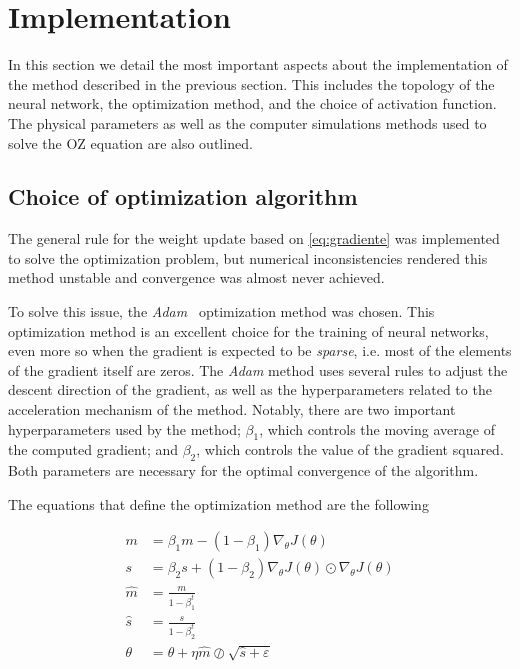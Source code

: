 \section{Implementation}
In this section we detail the most important aspects about the implementation of the
method described in the previous section. This includes the topology of the neural network,
the optimization method, and the choice of activation function. The physical parameters
as well as the computer simulations methods used to solve the OZ equation are also outlined.

\subsection{Choice of optimization algorithm}
The general rule for the weight update based on \autoref{eq:gradiente} was
implemented to solve the optimization problem, but numerical inconsistencies rendered this 
method unstable and convergence was almost never achieved.

To solve this issue, the \emph{Adam}~\cite{kingmaAdamMethodStochastic2017} optimization 
method was chosen. This optimization method is an excellent choice for the training
of neural networks, even more so when the gradient is expected to be \emph{sparse}, i.e.
most of the elements of the gradient itself are zeros.
The \emph{Adam} method uses several rules to adjust the descent direction of the gradient,
as well as the hyperparameters related to the acceleration mechanism of the method.
Notably, there are two important hyperparameters used by the method; $\beta_1$,
which controls the moving average of the computed gradient; and $\beta_2$, which controls
the value of the gradient squared. Both parameters are necessary for the optimal 
convergence of the algorithm.

The equations that define the optimization method are the following

\begin{align}
    m &= \beta_1 m - (1 - \beta_1) \nabla_{\theta} J(\theta) \nonumber \\
    s &= \beta_2 s + (1 - \beta_2) \nabla_{\theta} J(\theta) \odot \nabla_{\theta} J(\theta) \nonumber \\
    \hat{m} &= \frac{m}{1 - \beta_1^t} \nonumber \\
    \hat{s} &= \frac{s}{1 - \beta_2^t} \nonumber \\
    \theta &= \theta + \eta \hat{m} \oslash \sqrt{\hat{s} + \varepsilon}
    \label{eq:adam}
\end{align}

